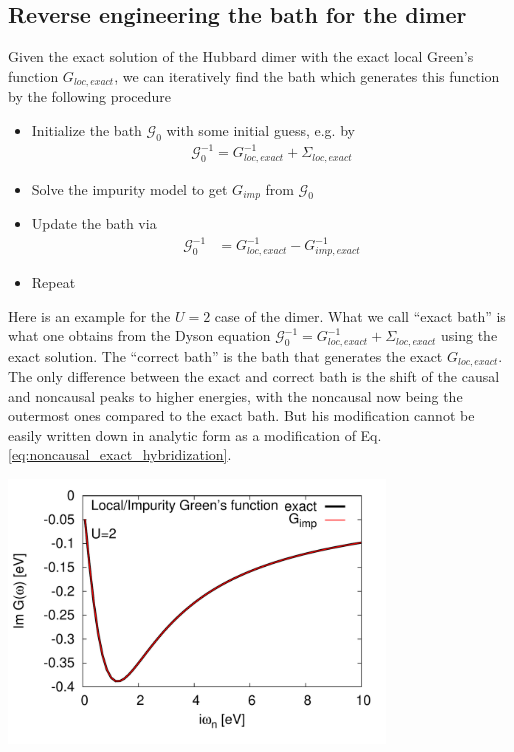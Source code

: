 \documentclass[12pt,a4paper]{scrartcl}
\numberwithin{equation}{section}
\begin{document}

 


\subsection{Reverse engineering the bath for the dimer}
Given the exact solution of the Hubbard dimer with the exact local Green's function
$G_{loc,exact}$, we can iteratively find the bath which generates this function by the following procedure
\begin{itemize}
 \item Initialize the bath $\mathcal{G}_0$ with some initial guess, e.g. by 
 \begin{align}
\mathcal{G}_0^{-1}=G^{-1}_{loc,exact}+\Sigma_{loc,exact}
 \end{align}
 
 \item Solve the impurity model to get $G_{imp}$ from $\mathcal{G}_0$
 
 \item Update the bath via
 \begin{align}
  \mathcal{G}_0^{-1} &= G^{-1}_{loc,exact} - G^{-1}_{imp,exact}
 \end{align}
 
 \item Repeat

\end{itemize}

Here is an example for the $U=2$ case of the dimer. What we call ``exact bath'' is what one obtains from
the Dyson equation $\mathcal{G}_0^{-1}=G^{-1}_{loc,exact}+\Sigma_{loc,exact}$ using the exact solution.
The ``correct bath'' is the bath that generates the exact $G_{loc,exact}$.
The only difference between the exact and correct bath is the shift of the causal and  noncausal peaks to higher energies,
with the noncausal now being the outermost ones compared to the exact bath.
But his modification cannot be easily written down in analytic form as a modification of
Eq.\eqref{eq:noncausal_exact_hybridization}.

\includegraphics[width=0.75\textwidth]{figs/reversebath/dimerbath/g_loc_exact.pdf}
\end{document}
